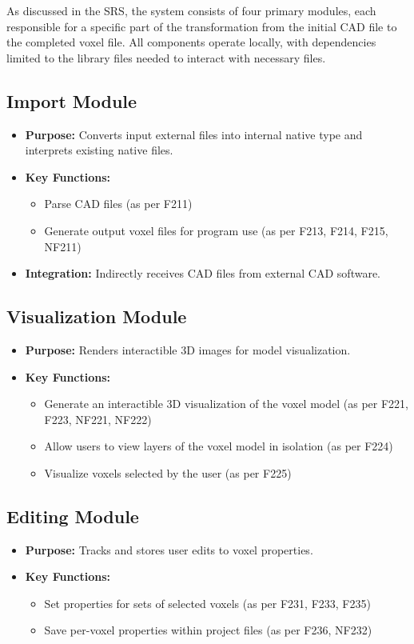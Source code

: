 \documentclass{article}
\begin{document}
As discussed in the SRS, the system consists of four primary modules, each responsible
for a specific part of the transformation from the initial CAD file to the completed 
voxel file. All components operate locally, with dependencies limited to
the library files needed to interact with necessary files.

\subsection{Import Module}
\begin{itemize}
    \item \textbf{Purpose:} Converts input external files into internal native type and interprets existing native files.
    \item \textbf{Key Functions:} 
    \begin{itemize}
        \item Parse CAD files (as per F211)
        \item Generate output voxel files for program use (as per F213, F214, F215, NF211)
    \end{itemize}
    \item \textbf{Integration:} Indirectly receives CAD files from external CAD software.
\end{itemize}

\subsection{Visualization Module}
\begin{itemize}
    \item \textbf{Purpose:} Renders interactible 3D images for model visualization.
    \item \textbf{Key Functions:} 
    \begin{itemize}
        \item Generate an interactible 3D visualization of the voxel model (as per F221, F223, NF221, NF222)
        \item Allow users to view layers of the voxel model in isolation (as per F224)
        \item Visualize voxels selected by the user (as per F225)
    \end{itemize}
\end{itemize}

\subsection{Editing Module}
\begin{itemize}
    \item \textbf{Purpose:} Tracks and stores user edits to voxel properties.
    \item \textbf{Key Functions:} 
    \begin{itemize}
        \item Set properties for sets of selected voxels (as per F231, F233, F235)
        \item Save per-voxel properties within project files (as per F236, NF232)
    \end{itemize}
\end{itemize}
\end{document}
